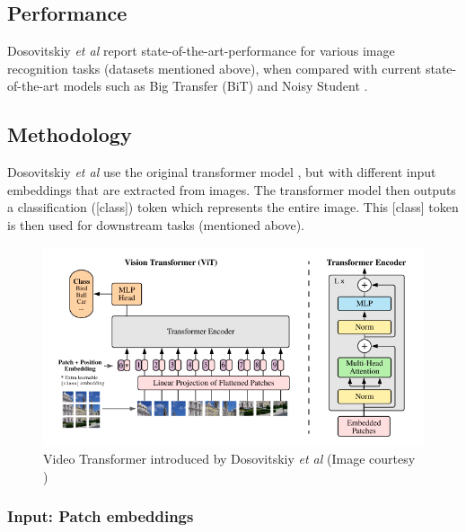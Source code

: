 \subsection{Performance}
\par Dosovitskiy \textit{et al} report state-of-the-art-performance for various image recognition tasks (datasets mentioned above), when compared with current state-of-the-art models such as Big Transfer (BiT) \cite{bit} and Noisy Student \cite{nos}.\par


\subsection{Methodology}

\par Dosovitskiy \textit{et al} use the original transformer model \cite{tfm}, but with different input embeddings that are extracted from images. The transformer model then outputs a classification ([class]) token which represents the entire image. This [class] token is then used for downstream tasks (mentioned above).\par

\begin{figure}[h]
	\includegraphics[width=\linewidth]{assets/img/vit.png}
	\caption{Video Transformer introduced by Dosovitskiy \textit{et al} (Image courtesy \cite{vit})}
\end{figure}


\subsubsection{Input: Patch embeddings}


